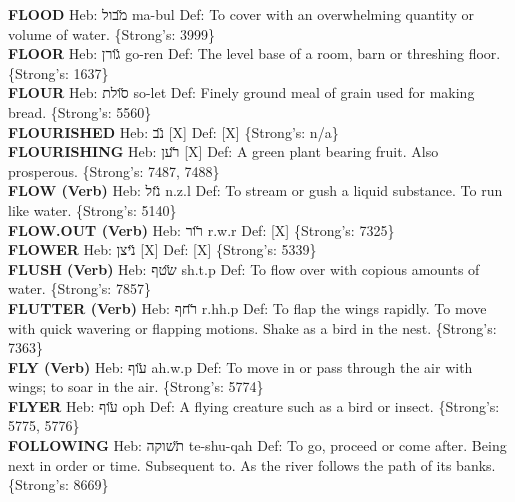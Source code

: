 {\textbf{FLOOD} Heb: {\large\H מבול} ma-bul Def: To cover with an overwhelming quantity or volume of water. \{Strong's: 3999\}\hfill{}\\

\textbf{FLOOR} Heb: {\large\H גורן} go-ren Def: The level base of a room, barn or threshing floor. \{Strong's: 1637\}\hfill{}\\

\textbf{FLOUR} Heb: {\large\H סולת} so-let Def: Finely ground meal of grain used for making bread. \{Strong's: 5560\}\hfill{}\\

\textbf{FLOURISHED} Heb: {\large\H נב} {[}X{]} Def: {[}X{]} \{Strong's: n/a\}\hfill{}\\

\textbf{FLOURISHING} Heb: {\large\H רען} {[}X{]} Def: A green plant bearing fruit. Also prosperous. \{Strong's: 7487, 7488\}\hfill{}\\

\textbf{FLOW (Verb)} Heb: {\large\H נזל} n.z.l Def: To stream or gush a liquid substance. To run like water. \{Strong's: 5140\}\hfill{}\\

\textbf{FLOW.OUT (Verb)} Heb: {\large\H רור} r.w.r Def: {[}X{]} \{Strong's: 7325\}\hfill{}\\

\textbf{FLOWER} Heb: {\large\H ניצן} {[}X{]} Def: {[}X{]} \{Strong's: 5339\}\hfill{}\\

\textbf{FLUSH (Verb)} Heb: {\large\H שטף} sh.t.p Def: To flow over with copious amounts of water. \{Strong's: 7857\}\hfill{}\\

\textbf{FLUTTER (Verb)} Heb: {\large\H רחף} r.hh.p Def: To flap the wings rapidly. To move with quick wavering or flapping motions. Shake as a bird in the nest. \{Strong's: 7363\}\hfill{}\\

\textbf{FLY (Verb)} Heb: {\large\H עוף} ah.w.p Def: To move in or pass through the air with wings; to soar in the air. \{Strong's: 5774\}\hfill{}\\

\textbf{FLYER} Heb: {\large\H עוף} oph Def: A flying creature such as a bird or insect. \{Strong's: 5775, 5776\}\hfill{}\\

\textbf{FOLLOWING} Heb: {\large\H תשוקה} te-shu-qah Def: To go, proceed or come after. Being next in order or time. Subsequent to. As the river follows the path of its banks. \{Strong's: 8669\}\hfill{}\\

}
